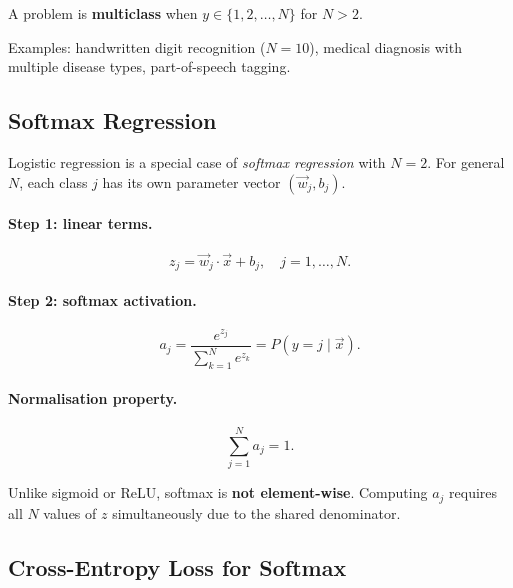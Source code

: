 \begin{definition}
A problem is \textbf{multiclass} when $y\in\{1,2,\ldots,N\}$ for $N>2$.
\end{definition}

Examples: handwritten digit recognition ($N=10$), medical diagnosis with
multiple disease types, part-of-speech tagging.

\subsection{Softmax Regression}

Logistic regression is a special case of \emph{softmax regression} with $N=2$.
For general $N$, each class $j$ has its own parameter vector $(\vec{w}_j,b_j)$.

\paragraph{Step 1: linear terms.}
\begin{equation}
z_j=\vec{w}_j\cdot\vec{x}+b_j,\quad j=1,\ldots,N.
\end{equation}

\paragraph{Step 2: softmax activation.}
\begin{equation}
\boxed{a_j=\frac{e^{z_j}}{\displaystyle\sum_{k=1}^N e^{z_k}}=P(y=j\mid\vec{x}).}
\label{eq:softmax}
\end{equation}

\paragraph{Normalisation property.}
\begin{equation}
\sum_{j=1}^N a_j=1.
\end{equation}

\begin{remark}
Unlike sigmoid or ReLU, softmax is \textbf{not element-wise}. Computing $a_j$
requires all $N$ values of $z$ simultaneously due to the shared denominator.
\end{remark}

\subsection{Cross-Entropy Loss for Softmax}

